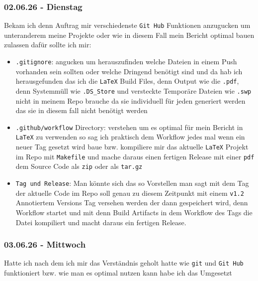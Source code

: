 \subsubsection{02.06.26 - Dienstag}

Bekam ich denn Auftrag mir verschiedenste \texttt{Git Hub} Funktionen anzugucken um unteranderem meine Projekte oder wie in diesem Fall mein Bericht optimal bauen zulassen dafür sollte ich mir:

\begin{itemize}[itemsep=2pt, topsep=4pt]
  \item \texttt{.gitignore}: angucken um herauszufinden welche Dateien in einem Push vorhanden sein sollten oder welche Dringend benötigt sind und da hab ich herausgefunden das ich die \texttt{LaTeX} Build Files, denn Output wie die \texttt{.pdf}, denn Systemmüll wie \texttt{.DS\_Store} und versteckte Temporäre Dateien wie \texttt{.swp} nicht in meinem Repo brauche da sie individuell für jeden generiert werden das sie in diesem fall nicht benötigt werden
  \item \texttt{.github/workflow} Directory: verstehen um es optimal für mein Bericht in \texttt{LaTeX} zu verwenden so sag ich praktisch dem Workflow jedes mal wenn ein neuer Tag gesetzt wird baue bzw. kompiliere mir das aktuelle \texttt{LaTeX} Projekt im Repo mit \texttt{Makefile} und mache daraus einen fertigen Release mit einer \texttt{pdf} dem Source Code als \texttt{zip} oder als \texttt{tar.gz}
  \item \texttt{Tag und Release}: Man könnte sich das so Vorstellen man sagt mit dem Tag der aktuelle Code im Repo soll genau zu diesem Zeitpunkt mit einem \texttt{v1.2} Annotiertem Versions Tag versehen werden der dann gespeichert wird, denn Workflow startet und mit denn Build Artifacts in dem Workflow des Tags die Datei kompiliert und macht daraus ein fertigen Release.
\end{itemize}

\subsubsection{03.06.26 - Mittwoch}

Hatte ich nach dem ich mir das Verständnis geholt hatte wie \texttt{git} und \texttt{Git Hub} funktioniert bzw. wie man es optimal nutzen kann habe ich das Umgesetzt

